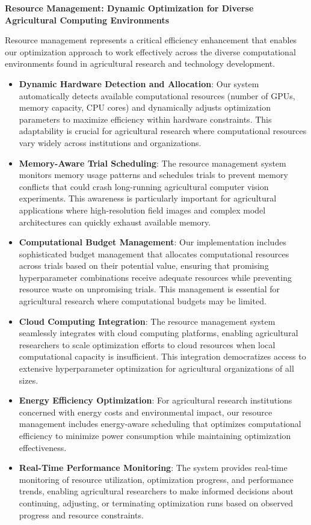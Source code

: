 \textbf{Resource Management: Dynamic Optimization for Diverse Agricultural Computing Environments}

Resource management represents a critical efficiency enhancement that enables our optimization approach to work effectively across the diverse computational environments found in agricultural research and technology development.

\begin{itemize}
    \item \textbf{Dynamic Hardware Detection and Allocation}: Our system automatically detects available computational resources (number of GPUs, memory capacity, CPU cores) and dynamically adjusts optimization parameters to maximize efficiency within hardware constraints. This adaptability is crucial for agricultural research where computational resources vary widely across institutions and organizations.
    
    \item \textbf{Memory-Aware Trial Scheduling}: The resource management system monitors memory usage patterns and schedules trials to prevent memory conflicts that could crash long-running agricultural computer vision experiments. This awareness is particularly important for agricultural applications where high-resolution field images and complex model architectures can quickly exhaust available memory.
    
    \item \textbf{Computational Budget Management}: Our implementation includes sophisticated budget management that allocates computational resources across trials based on their potential value, ensuring that promising hyperparameter combinations receive adequate resources while preventing resource waste on unpromising trials. This management is essential for agricultural research where computational budgets may be limited.
    
    \item \textbf{Cloud Computing Integration}: The resource management system seamlessly integrates with cloud computing platforms, enabling agricultural researchers to scale optimization efforts to cloud resources when local computational capacity is insufficient. This integration democratizes access to extensive hyperparameter optimization for agricultural organizations of all sizes.
    
    \item \textbf{Energy Efficiency Optimization}: For agricultural research institutions concerned with energy costs and environmental impact, our resource management includes energy-aware scheduling that optimizes computational efficiency to minimize power consumption while maintaining optimization effectiveness.
    
    \item \textbf{Real-Time Performance Monitoring}: The system provides real-time monitoring of resource utilization, optimization progress, and performance trends, enabling agricultural researchers to make informed decisions about continuing, adjusting, or terminating optimization runs based on observed progress and resource constraints.
\end{itemize}

